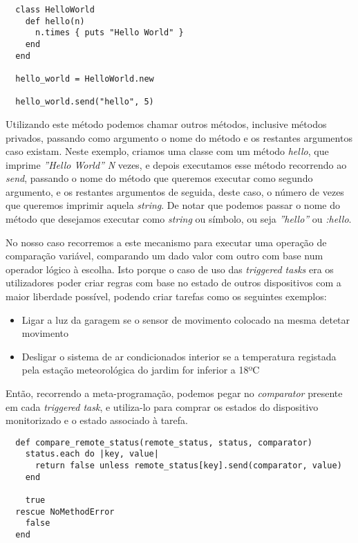 \begin{verbatim}
  class HelloWorld
    def hello(n)
      n.times { puts "Hello World" }
    end
  end

  hello_world = HelloWorld.new

  hello_world.send("hello", 5)
\end{verbatim}

Utilizando este método podemos chamar outros métodos, inclusive métodos privados, passando como argumento o nome do método e os restantes argumentos caso existam. Neste exemplo, criamos uma classe com um método \textit{hello}, que imprime \textit{''Hello World''} \textit{N} vezes, e depois executamos esse método recorrendo ao \textit{send}, passando o nome do método que queremos executar como segundo argumento, e os restantes argumentos de seguida, deste caso, o número de vezes que queremos imprimir aquela \textit{string}. De notar que podemos passar o nome do método que desejamos executar como \textit{string} ou símbolo, ou seja \textit{''hello''} ou \textit{:hello}.

No nosso caso recorremos a este mecanismo para executar uma operação de comparação variável, comparando um dado valor com outro com base num operador lógico à escolha. Isto porque o caso de uso das \textit{triggered tasks} era os utilizadores poder criar regras com base no estado de outros dispositivos com a maior liberdade possível, podendo criar tarefas como os seguintes exemplos:
\begin{itemize}
  \item Ligar a luz da garagem se o sensor de movimento colocado na mesma detetar movimento
  \item Desligar o sistema de ar condicionados interior se a temperatura registada pela estação meteorológica do jardim for inferior a 18ºC
\end{itemize}

Então, recorrendo a meta-programação, podemos pegar no \textit{comparator} presente em cada \textit{triggered task}, e utiliza-lo para comprar os estados do dispositivo monitorizado e o estado associado à tarefa.

\begin{verbatim}
  def compare_remote_status(remote_status, status, comparator)
    status.each do |key, value|
      return false unless remote_status[key].send(comparator, value)
    end

    true
  rescue NoMethodError
    false
  end
\end{verbatim}

